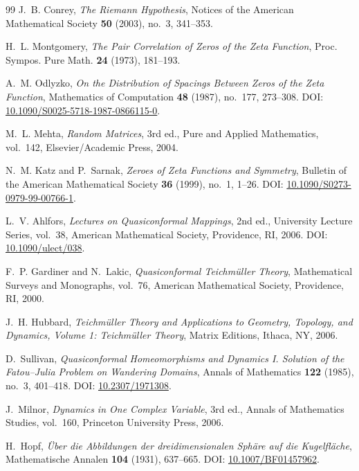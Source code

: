 \begin{thebibliography}{99}
J.~B. Conrey,
\emph{The Riemann Hypothesis},
Notices of the American Mathematical Society \textbf{50} (2003), no.~3, 341--353.

H.~L. Montgomery,
\emph{The Pair Correlation of Zeros of the Zeta Function},
Proc. Sympos. Pure Math. \textbf{24} (1973), 181--193.

A.~M. Odlyzko,
\emph{On the Distribution of Spacings Between Zeros of the Zeta Function},
Mathematics of Computation \textbf{48} (1987), no.~177, 273--308.
\newblock DOI: \href{https://doi.org/10.1090/S0025-5718-1987-0866115-0}{10.1090/S0025-5718-1987-0866115-0}.

M.~L. Mehta,
\emph{Random Matrices},
3rd ed., Pure and Applied Mathematics, vol.~142,
Elsevier/Academic Press, 2004.

N.~M. Katz and P.~Sarnak,
\emph{Zeroes of Zeta Functions and Symmetry},
Bulletin of the American Mathematical Society \textbf{36} (1999), no.~1, 1--26.
\newblock DOI: \href{https://doi.org/10.1090/S0273-0979-99-00766-1}{10.1090/S0273-0979-99-00766-1}.

L.~V. Ahlfors,
\emph{Lectures on Quasiconformal Mappings},
2nd ed., University Lecture Series, vol.~38,
American Mathematical Society, Providence, RI, 2006.
\newblock DOI: \href{https://doi.org/10.1090/ulect/038}{10.1090/ulect/038}.

F.~P. Gardiner and N.~Lakic,
\emph{Quasiconformal Teichm\"uller Theory},
Mathematical Surveys and Monographs, vol.~76,
American Mathematical Society, Providence, RI, 2000.

J.~H. Hubbard,
\emph{Teichm\"uller Theory and Applications to Geometry, Topology, and Dynamics, Volume 1: Teichm\"uller Theory},
Matrix Editions, Ithaca, NY, 2006.

D.~Sullivan,
\emph{Quasiconformal Homeomorphisms and Dynamics I. Solution of the Fatou--Julia Problem on Wandering Domains},
Annals of Mathematics \textbf{122} (1985), no.~3, 401--418.
\newblock DOI: \href{https://doi.org/10.2307/1971308}{10.2307/1971308}.

J.~Milnor,
\emph{Dynamics in One Complex Variable},
3rd ed., Annals of Mathematics Studies, vol.~160,
Princeton University Press, 2006.

H.~Hopf,
\emph{\"Uber die Abbildungen der dreidimensionalen Sph\"are auf die Kugelfl\"ache},
Mathematische Annalen \textbf{104} (1931), 637--665.
\newblock DOI: \href{https://doi.org/10.1007/BF01457962}{10.1007/BF01457962}.


\end{thebibliography}
